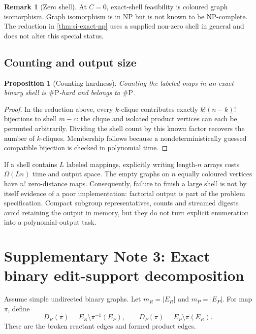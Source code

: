 \documentclass[11pt]{article}
\newtheorem{proposition}[theorem]{Proposition}
\theoremstyle{definition}
\newtheorem{remark}[theorem]{Remark}
\begin{document}
\begin{remark}[Zero shell]
At \(C=0\), exact-shell feasibility is coloured graph isomorphism.  Graph
isomorphism is in NP but is not known to be NP-complete.  The reduction in
\cref{thm:si-exact-np} uses a supplied non-zero shell in general and does not
alter this special status.
\end{remark}

\subsection{Counting and output size}

\begin{proposition}[Counting hardness]
Counting the labeled maps in an exact binary shell is \(\#\mathrm P\)-hard
and belongs to \(\#\mathrm P\).
\end{proposition}

\begin{proof}
In the reduction above, every \(k\)-clique contributes exactly
\(k!(n-k)!\) bijections to shell \(m-c\): the clique and isolated product
vertices can each be permuted arbitrarily.  Dividing the shell count by this
known factor recovers the number of \(k\)-cliques.  Membership follows because
a nondeterministically guessed compatible bijection is checked in polynomial
time.
\end{proof}

If a shell contains \(L\) labeled mappings, explicitly writing length-\(n\)
arrays costs \(\Omega(Ln)\) time and output space.  The empty graphs on \(n\)
equally coloured vertices have \(n!\) zero-distance maps.  Consequently,
failure to finish a large shell is not by itself evidence of a poor
implementation: factorial output is part of the problem specification.
Compact subgroup representatives, counts and streamed digests avoid retaining
the output in memory, but they do not turn explicit enumeration into a
polynomial-output task.

\section{Supplementary Note 3: Exact binary edit-support decomposition}

Assume simple undirected binary graphs.  Let \(m_R=|E_R|\) and
\(m_P=|E_P|\).  For map \(\pi\), define
\[
 D_R(\pi)=E_R\setminus \pi^{-1}(E_P),\qquad
 D_P(\pi)=E_P\setminus \pi(E_R).
\]
These are the broken reactant edges and formed product edges.
\end{document}
